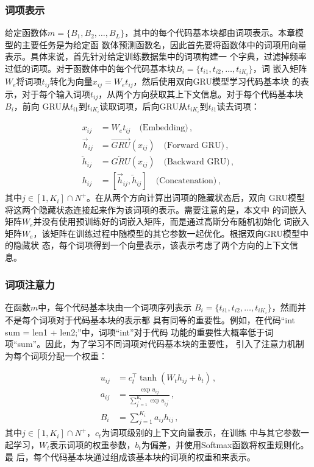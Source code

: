 \subsubsection{词项表示}
给定函数体$m=\{B_1,B_2,\dots,B_L\}$，其中的每个代码基本块都由词项表示。本章模型的主要任务是为给定函
数体预测函数名，因此首先要将函数体中的词项用向量表示。具体来说，首先针对给定训练数据集中的词项构建一
个字典，过滤掉频率过低的词项。对于函数体中的每个代码基本块$B_i=\{t_{i1},t_{i2},\dots,t_{iK_i}\}$，词
嵌入矩阵$W_e$将词项$t_{ij}$转化为向量$x_{ij}=W_e t_{ij}$，然后使用双向GRU模型学习代码基本块
的表示，对于每个输入词项$t_{ij}$，从两个方向获取其上下文信息。对于每个代码基本块$B_i$，前向
GRU从$t_{i1}$到$t_{iK_i}$读取词项，后向GRU从$t_{iK_i}$到$t_{i1}$读去词项：

\begin{align}
	x_{ij} &= W_e t_{ij} \quad\text{(Embedding)} \,, \\
	\overrightarrow{h}_{ij} &= \overrightarrow{GRU}(x_{ij}) 
	\quad\text{(Forward GRU)} \,, \\
       \overleftarrow{h}_{ij} &= \overleftarrow{GRU}(x_{ij}) 
       \quad\text{(Backward GRU)} \,, \\
       h_{ij} &= [\overrightarrow{h}_{ij}, \overleftarrow{h}_{ij}] 
       \quad\text{(Concatenation)} \,,
\end{align}
\label{eq:token_encoder}
其中$j\in [1, K_i] \cap N^+$。在从两个方向计算出词项的隐藏状态后，双向
GRU模型将这两个隐藏状态连接起来作为该词项的表示。需要注意的是，本文中
的词嵌入矩阵$W_e$并没有使用预训练好的词嵌入矩阵，而是通过高斯分布随机初始化
词嵌入矩阵$W_e$，该矩阵在训练过程中随模型的其它参数一起优化。根据双向GRU模型中的隐藏状
态，每个词项得到一个向量表示，该表示考虑了两个方向的上下文信息。

\subsubsection{词项注意力}
在函数$m$中，每个代码基本块由一个词项序列表示
$B_i=\{t_{i1},t_{i2},\dots,t_{iK_i}\}$，然而并不是每个词项对于代码基本块的表示都
具有同等的重要性。例如，在代码``int sum = len1 + len2;''中，词项``int''对于代码
功能的重要性大概率低于词项``sum''。因此，为了学习不同词项对代码基本块的重要性，
引入了注意力机制为每个词项分配一个权重：

\begin{align}
    u_{ij} &= c_t^\top \tanh(W_t h_{ij} + b_t) \,, \\
    a_{ij} &= \frac{\exp{u_{ij}}}{\sum_{j^\prime=1}^{K_i} \exp{u_{ij^\prime}}} 
    \,, \\
    B_{i} &= \sum_{j=1}^{K_i} a_{ij}h_{ij} \,,
\end{align}
\label{eq:token_attn}
其中$j\in [1, K_i] \cap N^+$，$c_t$为词项级别的上下文向量表示，在训练
中与其它参数一起学习，$W_t$表示词项的权重参数，$b_t$为偏差，并使用Softmax函数将权重规则化。最
后，每个代码基本块通过组成该基本块的词项的权重和来表示。

